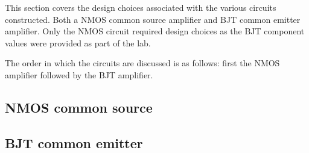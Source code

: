 



This section covers the design choices associated with the various circuits constructed. Both a NMOS common source amplifier and BJT common emitter amplifier. Only the NMOS circuit required design choices as the BJT component values were provided as part of the lab.

The order in which the circuits are discussed is as follows: first the NMOS amplifier followed by the BJT amplifier.


\subsection{NMOS common source}


\subsection{BJT common emitter}





